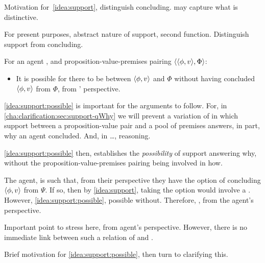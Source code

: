 \begin{note}
  Motivation for~\autoref{idea:support}, distinguish concluding.
   may capture what is distinctive.

  For present purposes, abstract nature of support, second function.
  Distinguish support from concluding.
\end{note}

\begin{note}
  \begin{idea}[Support II]
    \label{idea:support:possible}
    For an agent \vAgent{}, and proposition-value-premises pairing \(\langle \langle \phi, v \rangle, \Phi \rangle\):

    \begin{itemize}
    \item
      It is possible for there to be \support{} between \(\langle \phi, v \rangle\) and \(\Phi\) without \vAgent{} having concluded \(\langle \phi, v \rangle\) from \(\Phi\), from \vAgent{}' perspective.
    \end{itemize}
    \vspace{-\baselineskip}
  \end{idea}

  \autoref{idea:support:possible} is important for the arguments to follow.
  For, in \autoref{cha:clarification:sec:support-qWhy} we will prevent a variation of \qWhy{} in which support between a proposition-value pair and a pool of premises answers, in part, why an agent concluded.
  And, in \dots \qHow{}, reasoning.

  \autoref{idea:support:possible} then, establishes the \emph{possibility} of support answering why, without the proposition-value-premises pairing being involved in how.

  The agent, is such that, from their perspective they have the option of concluding \(\langle \phi, v \rangle\) from \(\Psi\).
  If so, then by \autoref{idea:support}, taking the option would involve a \support{}.
  However, \autoref{idea:support:possible}, possible without.
  Therefore, \support{}, from the agent's perspective.
\end{note}

\begin{note}
  Important point to stress here, \support{} from agent's perspective.
  However, there is no immediate link between such a relation of \support{} and \qWhy{}.

  Brief motivation for \autoref{idea:support:possible}, then turn to clarifying this.
\end{note}

